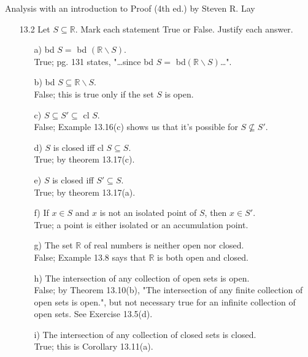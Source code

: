 \documentclass[12pt]{article}
\begin{document}
Analysis with an introduction to Proof (4th ed.) by Steven R. Lay
\begin{enumerate}

\item[13.2] Let $S \subseteq \mathbb{R}$. Mark each statement True or False. Justify each answer.
\begin{enumerate}
\item[a)] bd $S = $ bd $(\mathbb{R}\backslash S)$. \\
True; pg. 131 states, "\ldots since bd $S = $ bd$(\mathbb{R}\backslash S)$\ldots".
\item[b)] bd $S \subseteq \mathbb{R}\backslash S$. \\
False; this is true only if the set $S$ is open.
\item[c)] $S \subseteq S' \subseteq $ cl $S$. \\
False; Example 13.16(c) shows us that it's possible for $S \not\subseteq S'$.
\item[d)] $S$ is closed iff cl $S \subseteq S$. \\
True; by theorem 13.17(c).
\item[e)] $S$ is closed iff $S' \subseteq S$. \\
True; by theorem 13.17(a).
\item[f)] If $x \in S$ and $x$ is not an isolated point of $S$, then $x \in S'$. \\
True; a point is either isolated or an accumulation point.
\item[g)] The set $\mathbb{R}$ of real numbers is neither open nor closed. \\
False; Example 13.8 says that $\mathbb{R}$ is both open and closed.
\item[h)] The intersection of any collection of open sets is open. \\
False; by Theorem 13.10(b), "The intersection of any finite collection of open sets is open.",
but not necessary true for an infinite collection of open sets. See Exercise 13.5(d).
\item[i)] The intersection of any collection of closed sets is closed. \\
True; this is Corollary 13.11(a).
\end{enumerate}


\end{enumerate}
\end{document}
